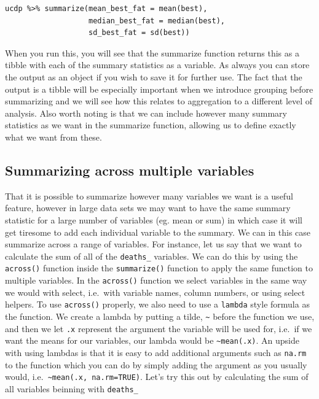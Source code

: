 \documentclass[
]{book}
\begin{document}
\begin{verbatim}
ucdp %>% summarize(mean_best_fat = mean(best),
                   median_best_fat = median(best),
                   sd_best_fat = sd(best))
\end{verbatim}

When you run this, you will see that the summarize function returns this as a tibble with each of the summary statistics as a variable. As always you can store the output as an object if you wish to save it for further use. The fact that the output is a tibble will be especially important when we introduce grouping before summarizing and we will see how this relates to aggregation to a different level of analysis. Also worth noting is that we can include however many summary statistics as we want in the summarize function, allowing us to define exactly what we want from these.

\hypertarget{summarizing-across-multiple-variables}{%
\subsection{Summarizing across multiple variables}\label{summarizing-across-multiple-variables}}

That it is possible to summarize however many variables we want is a useful feature, however in large data sets we may want to have the same summary statistic for a large number of variables (eg. mean or sum) in which case it will get tiresome to add each individual variable to the summary. We can in this case summarize across a range of variables. For instance, let us say that we want to calculate the sum of all of the \texttt{deaths\_} variables. We can do this by using the \texttt{across()} function inside the \texttt{summarize()} function to apply the same function to multiple variables. In the \texttt{across()} function we select variables in the same way we would with select, i.e.~with variable names, column numbers, or using select helpers. To use \texttt{across()} properly, we also need to use a \texttt{lambda} style formula as the function. We create a lambda by putting a tilde, \texttt{\textasciitilde{}} before the function we use, and then we let \texttt{.x} represent the argument the variable will be used for, i.e.~if we want the means for our variables, our lambda would be \texttt{\textasciitilde{}mean(.x)}. An upside with using lambdas is that it is easy to add additional arguments such as \texttt{na.rm} to the function which you can do by simply adding the argument as you usually would, i.e.~\texttt{\textasciitilde{}mean(.x,\ na.rm=TRUE)}. Let's try this out by calculating the sum of all variables beinning with \texttt{deaths\_}
\end{document}
